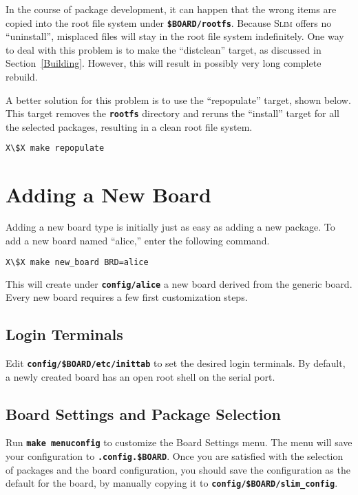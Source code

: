 \documentclass[a4paper,10pt]{article}
\newcommand{\slim}{\textsc{Slim}\xspace}
\newcommand{\fw}{\tt\bf}
\begin{document}
    In the course of package development, it can happen that the wrong
    items are copied into the root file system under {\fw \$BOARD/rootfs}.
    Because \slim offers no ``uninstall'', misplaced files will stay
    in the root file system indefinitely. One way to deal with this
    problem is to make the ``distclean'' target, as discussed in
    Section~\ref{Building}. However, this will result in possibly very
    long complete rebuild.

    A better solution for this problem is to use the ``repopulate''
    target, shown below. This target removes the {\fw rootfs}
    directory and reruns the ``install'' target for all the selected
    packages, resulting in a clean root file system.

\begin{lstlisting}[language=bash,escapechar=X]
X\$X make repopulate
\end{lstlisting}

\section{Adding a New Board}

    Adding a new board type is initially just as easy as adding a new
    package. To add a new board named ``alice,'' enter the following
    command.

\begin{lstlisting}[language=bash,escapechar=X]
X\$X make new_board BRD=alice
\end{lstlisting}

   This will create under {\fw config/alice} a new board derived from
   the generic board. Every new board requires a few first
   customization steps.

\subsection{Login Terminals}

   Edit {\fw config/\$BOARD/etc/inittab} to set the desired login
   terminals. By default, a newly created board has an open root shell
   on the serial port.

\subsection{Board Settings and Package Selection}

   Run {\fw make menuconfig} to customize the Board Settings menu.
   The menu will save your configuration to {\fw .config.\$BOARD}.
   Once you are satisfied with the selection of packages and the board
   configuration, you should save the configuration as the default for
   the board, by manually copying it to {\fw config/\$BOARD/slim\_config}.
\end{document}
